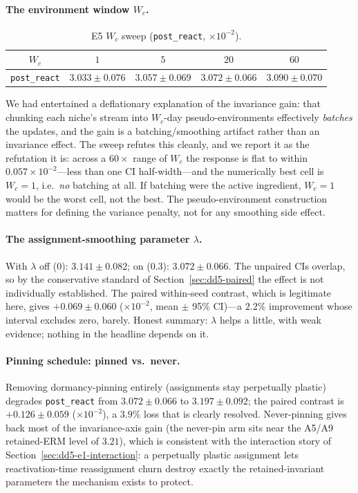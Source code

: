 \documentclass[11pt,a4paper]{article}
\theoremstyle{definition}
\theoremstyle{plain}
\begin{document}
\paragraph{The environment window $W_c$.}

\begin{table}[h]
\centering
\caption{E5 $W_c$ sweep (\texttt{post\_react}, $\times 10^{-2}$).}
\label{tab:dd5-e5-wc}
\small
\begin{tabular}{ccccc}
\toprule
$W_c$ & $1$ & $5$ & $20$ & $60$ \\
\midrule
\texttt{post\_react} & $3.033 \pm 0.076$ & $3.057 \pm 0.069$ &
$3.072 \pm 0.066$ & $3.090 \pm 0.070$ \\
\bottomrule
\end{tabular}
\end{table}

We had entertained a deflationary explanation of the invariance gain: that
chunking each niche's stream into $W_c$-day pseudo-environments effectively
\emph{batches} the updates, and the gain is a batching/smoothing artifact
rather than an invariance effect. The sweep refutes this cleanly, and we
report it as the refutation it is: across a $60\times$ range of $W_c$ the
response is flat to within $0.057 \times 10^{-2}$---less than one CI
half-width---and the numerically best cell is $W_c = 1$, i.e.\ \emph{no}
batching at all. If batching were the active ingredient, $W_c = 1$ would be
the worst cell, not the best. The pseudo-environment construction matters
for defining the variance penalty, not for any smoothing side effect.

\paragraph{The assignment-smoothing parameter $\lambda$.}
With $\lambda$ off ($0$): $3.141 \pm 0.082$; on ($0.3$): $3.072 \pm 0.066$.
The unpaired CIs overlap, so by the conservative standard of
Section~\ref{sec:dd5-paired} the effect is not individually established.
The paired within-seed contrast, which is legitimate here, gives
$+0.069 \pm 0.060$ ($\times 10^{-2}$, mean $\pm$ 95\% CI)---a $2.2\%$
improvement whose interval excludes zero, barely. Honest summary:
$\lambda$ helps a little, with weak evidence; nothing in the headline
depends on it.

\paragraph{Pinning schedule: pinned vs.\ never.}
Removing dormancy-pinning entirely (assignments stay perpetually plastic)
degrades \texttt{post\_react} from $3.072 \pm 0.066$ to $3.197 \pm 0.092$;
the paired contrast is $+0.126 \pm 0.059$ ($\times 10^{-2}$), a $3.9\%$
loss that is clearly resolved. Never-pinning gives back most of the
invariance-axis gain (the never-pin arm sits near the A5/A9 retained-ERM
level of $3.21$), which is consistent with the interaction story of
Section~\ref{sec:dd5-e1-interaction}: a perpetually plastic assignment lets
reactivation-time reassignment churn destroy exactly the retained-invariant
parameters the mechanism exists to protect.
\end{document}
